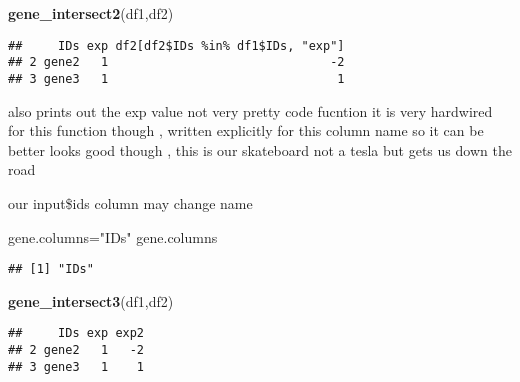 \documentclass[]{article}
\newenvironment{Shaded}{\begin{snugshade}}{\end{snugshade}}
\newcommand{\KeywordTok}[1]{\textcolor[rgb]{0.13,0.29,0.53}{\textbf{#1}}}
\newcommand{\DataTypeTok}[1]{\textcolor[rgb]{0.13,0.29,0.53}{#1}}
\newcommand{\StringTok}[1]{\textcolor[rgb]{0.31,0.60,0.02}{#1}}
\newcommand{\ControlFlowTok}[1]{\textcolor[rgb]{0.13,0.29,0.53}{\textbf{#1}}}
\newcommand{\OperatorTok}[1]{\textcolor[rgb]{0.81,0.36,0.00}{\textbf{#1}}}
\newcommand{\NormalTok}[1]{#1}
\begin{document}
\begin{Shaded}
\begin{Highlighting}[]
\KeywordTok{gene_intersect2}\NormalTok{(df1,df2)}
\end{Highlighting}
\end{Shaded}

\begin{verbatim}
##     IDs exp df2[df2$IDs %in% df1$IDs, "exp"]
## 2 gene2   1                               -2
## 3 gene3   1                                1
\end{verbatim}

also prints out the exp value not very pretty code fucntion it is very
hardwired for this function though , written explicitly for this column
name so it can be better looks good though , this is our skateboard not
a tesla but gets us down the road

our input\$ids column may change name

\begin{Shaded}
\begin{Highlighting}[]
\NormalTok{gene.columns=}\StringTok{"IDs"}
\NormalTok{gene.columns}
\end{Highlighting}
\end{Shaded}

\begin{verbatim}
## [1] "IDs"
\end{verbatim}

\begin{Shaded}
\end{Shaded}

\begin{Shaded}
\begin{Highlighting}[]
\KeywordTok{gene_intersect3}\NormalTok{(df1,df2)}
\end{Highlighting}
\end{Shaded}

\begin{verbatim}
##     IDs exp exp2
## 2 gene2   1   -2
## 3 gene3   1    1
\end{verbatim}
\end{document}
